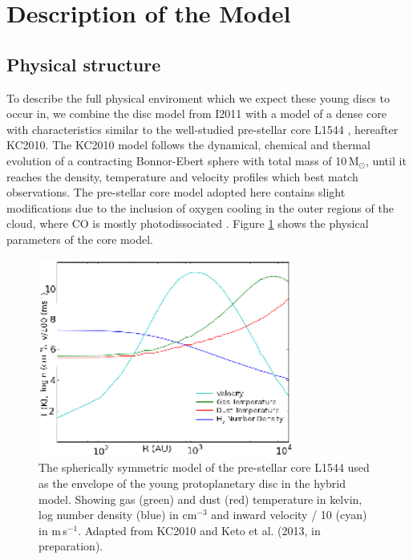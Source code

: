 \documentclass[useAMS,usenatbib]{mn2e}
\begin{document}
\section{Description of the Model} \label{sec:description_model}

\subsection{Physical structure} \label{subsec:physical_structure}

To describe the full physical enviroment which we expect these young discs to occur in, we combine the disc model from I2011 with a model of a dense core with characteristics similar to the well-studied pre-stellar core L1544 \citep{Keto2010}, hereafter KC2010. The KC2010 model follows the dynamical, chemical and thermal evolution of a contracting Bonnor-Ebert sphere \citep{Bonnor1956,Ebert1957} with total mass of 10\,M$_{\odot}$, until it reaches the density, temperature and velocity profiles which best match observations. The pre-stellar core model adopted here contains slight modifications due to the inclusion of oxygen cooling in the outer regions of the cloud, where CO is mostly photodissociated \citep{Caselli2012}. Figure \ref{fig:l1544_model} shows the physical parameters of the core model. \newline

\begin{figure}
 \includegraphics[width=84mm]{Figures/model/L1544model_used_legend_small.eps}
 \caption{The spherically symmetric model of the pre-stellar core L1544 used as the envelope of the young protoplanetary disc in the hybrid model. Showing gas (green) and dust (red) temperature in kelvin, log number density (blue) in cm$^{-3}$ and inward velocity / 10 (cyan) in m$\,$s$^{-1}$. Adapted from KC2010 and Keto et al. (2013, in preparation).}
 \label{fig:l1544_model}
\end{figure}
\end{document}
